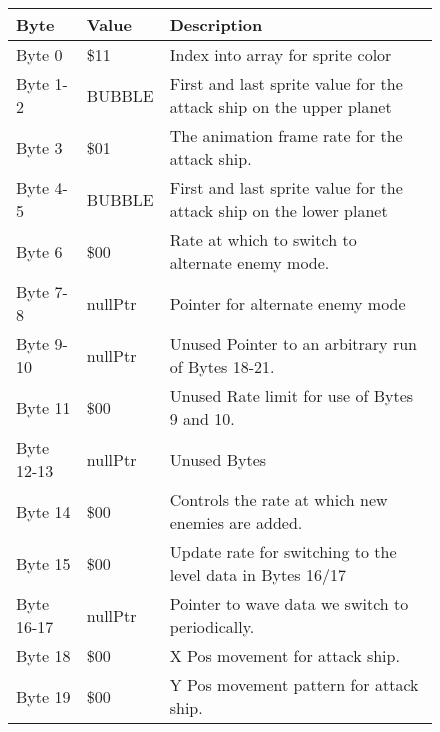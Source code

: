 \begin{figure}[H]
  {
  \setlength{\tabcolsep}{3.0pt}
  \setlength\cmidrulewidth{\heavyrulewidth} %
  \begin{adjustbox}{width=12cm}

\begin{tabular}{lll}
\toprule
 Byte       & Value                      & Description                                                         \\
\midrule
 Byte 0     & \$11                        & Index into array for sprite color                                   \\
 Byte 1-2   & BUBBLE                     & First and last sprite value for the attack ship on the upper planet \\
 Byte 3     & \$01                        & The animation frame rate for the attack ship.                       \\
 Byte 4-5   & BUBBLE                     & First and last sprite value for the attack ship on the lower planet \\
 Byte 6     & \$00                        & Rate at which to switch to alternate enemy mode.                    \\
 Byte 7-8   & nullPtr                    & Pointer for alternate enemy mode                                    \\
 Byte 9-10  & nullPtr                    & Unused Pointer to an arbitrary run of Bytes 18-21.                  \\
 Byte 11    & \$00                        & Unused Rate limit for use of Bytes 9 and 10.                        \\
 Byte 12-13 & nullPtr                    & Unused Bytes                                                        \\
 Byte 14    & \$00                        & Controls the rate at which new enemies are added.                   \\
 Byte 15    & \$00                        & Update rate for switching to the level data in Bytes 16/17          \\
 Byte 16-17 & nullPtr                    & Pointer to wave data we switch to periodically.                     \\
 Byte 18    & \$00                        & X Pos movement for attack ship.                                     \\
 Byte 19    & \$00                        & Y Pos movement pattern for attack ship.                             \\

\end{tabular}
\end{adjustbox}}
\end{figure}
